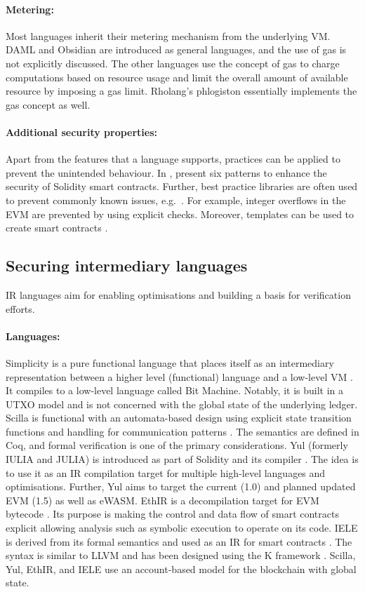 \documentclass{llncs}
\begin{document}
\paragraph{Metering:} Most languages inherit their metering mechanism from the underlying VM. DAML and Obsidian are introduced as general languages, and the use of gas is not explicitly discussed. The other languages use the concept of gas to charge computations based on resource usage and limit the overall amount of available resource by imposing a gas limit. Rholang's phlogiston essentially implements the gas concept as well.


\paragraph{Additional security properties:} 
Apart from the features that a language supports, practices can be applied to prevent the unintended behaviour.
In \cite{Wohrer2018}, present six patterns to enhance the security of Solidity smart contracts.
Further, best practice libraries are often used to prevent commonly known issues, e.g.\ \cite{ConsenSys2018Security}.
For example, integer overflows in the EVM are prevented by using explicit checks.
Moreover, templates can be used to create smart contracts \cite{Clack2016}.

\subsection{Securing intermediary languages}
IR languages aim for enabling optimisations and building a basis for verification efforts.

\paragraph{Languages:} Simplicity is a pure functional language that places itself as an intermediary representation between a higher level (functional) language and a low-level VM \cite{OConnor2017}. It compiles to a low-level language called Bit Machine. Notably, it is built in a UTXO model and is not concerned with the global state of the underlying ledger.
Scilla is functional with an automata-based design using explicit state transition functions and handling for communication patterns \cite{Sergey2018}. The semantics are defined in Coq, and formal verification is one of the primary considerations.
Yul (formerly IULIA and JULIA) is introduced as part of Solidity and its compiler \cite{EthereumFoundation2018IULIA}. The idea is to use it as an IR compilation target for multiple high-level languages and optimisations. Further, Yul aims to target the current (1.0) and planned updated EVM (1.5) as well as eWASM.
EthIR is a decompilation target for EVM bytecode \cite{Albert2018}. Its purpose is making the control and data flow of smart contracts explicit allowing analysis such as symbolic execution to operate on its code. 
IELE is derived from its formal semantics and used as an IR for smart contracts \cite{Kasampalis2018}. The syntax is similar to LLVM and has been designed using the K framework \cite{Rosu2007}.
Scilla, Yul, EthIR, and IELE use an account-based model for the blockchain with global state.
\end{document}
